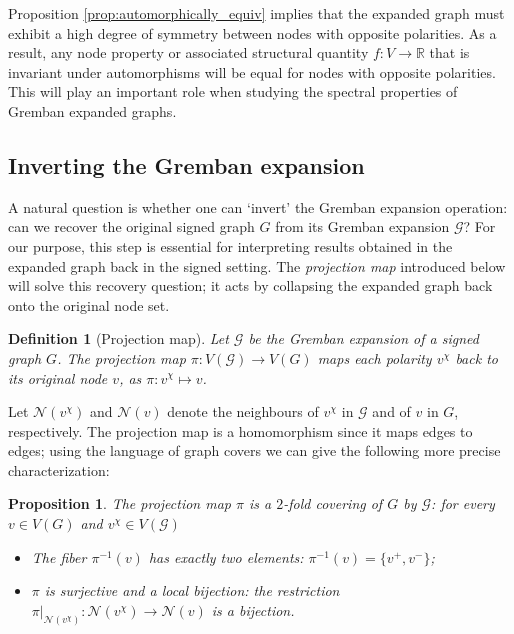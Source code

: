 \documentclass[reprint,onecolumn]{article}
\newtheorem{definition}[theorem]{Definition}  %
\newtheorem{proposition}[theorem]{Proposition}
\newcommand{\R}{\mathbb{R}}
\newcommand{\1}{\mathbb{1}}
\newcommand{\0}{\mathbf{0}}
\begin{document}
Proposition \ref{prop:automorphically_equiv} implies that the expanded graph must exhibit a high degree of symmetry between nodes with opposite polarities. As a result, any node property or associated structural quantity $f:V\rightarrow\R$ that is invariant under automorphisms will be equal for nodes with opposite polarities. This will play an important role when studying the spectral properties of Gremban expanded graphs.

\subsection{Inverting the Gremban expansion}\label{SS: inverting Gremban expansion}
A natural question is whether one can `invert' the Gremban expansion operation: can we recover the original signed graph $G$ from its Gremban expansion $\mathcal{G}$? For our purpose, this step is essential for interpreting results obtained in the expanded graph back in the signed setting. The \emph{projection map} introduced below will solve this recovery question; it acts by collapsing the expanded graph back onto the original node set. 
\begin{definition}[Projection map]
Let $\mathcal{G}$ be the Gremban expansion of a signed graph $G$. The \emph{projection map} $\pi:V(\mathcal{G})\rightarrow V(G)$ maps each polarity $v^\chi$ back to its original node $v$, as $\pi:v^\chi\mapsto v$.
\end{definition}
Let $\mathcal{N}(v^\chi)$ and $\mathcal{N}(v)$ denote the neighbours of $v^\chi$ in $\mathcal{G}$ and of $v$ in $G$, respectively. The projection map is a homomorphism since it maps edges to edges; using the language of graph covers \cite[\S6.8]{godsil2001algebraic} we can give the following more precise characterization:
\begin{proposition}  \label{prop:double_cover}
The projection map $\pi$ is a $2$-fold covering of $G$ by $\mathcal{G}$: for every $v\in V(G)$ and $v^\chi\in V(\mathcal{G})$
\begin{itemize}
    \item The fiber $\pi^{-1}(v)$ has exactly two elements: $\pi^{-1}(v)=\{v^{+},v^{-}\}$;
    \item $\pi$ is surjective and a local bijection: the restriction $\pi\vert_{\mathcal{N}(v^\chi)}:\mathcal{N}(v^\chi)\rightarrow\mathcal{N}(v)$ is a bijection.  
\end{itemize}
\end{proposition}
\end{document}
